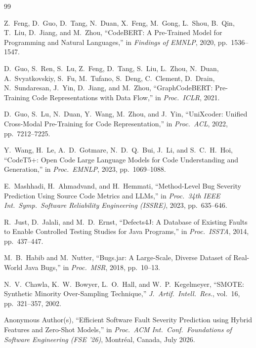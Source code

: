 \documentclass[12pt, a4paper]{report}
\begin{document}
\clearpage
\begin{thebibliography}{99}

Z.\ Feng, D.\ Guo, D.\ Tang, N.\ Duan, X.\ Feng, M.\ Gong, L.\ Shou, B.\ Qin, T.\ Liu, D.\ Jiang, and M.\ Zhou, ``CodeBERT: A Pre-Trained Model for Programming and Natural Languages,'' in \textit{Findings of EMNLP}, 2020, pp.\ 1536--1547.

D.\ Guo, S.\ Ren, S.\ Lu, Z.\ Feng, D.\ Tang, S.\ Liu, L.\ Zhou, N.\ Duan, A.\ Svyatkovskiy, S.\ Fu, M.\ Tufano, S.\ Deng, C.\ Clement, D.\ Drain, N.\ Sundaresan, J.\ Yin, D.\ Jiang, and M.\ Zhou, ``GraphCodeBERT: Pre-Training Code Representations with Data Flow,'' in \textit{Proc.\ ICLR}, 2021.

D.\ Guo, S.\ Lu, N.\ Duan, Y.\ Wang, M.\ Zhou, and J.\ Yin, ``UniXcoder: Unified Cross-Modal Pre-Training for Code Representation,'' in \textit{Proc.\ ACL}, 2022, pp.\ 7212--7225.

Y.\ Wang, H.\ Le, A.\ D.\ Gotmare, N.\ D.\ Q.\ Bui, J.\ Li, and S.\ C.\ H.\ Hoi, ``CodeT5+: Open Code Large Language Models for Code Understanding and Generation,'' in \textit{Proc.\ EMNLP}, 2023, pp.\ 1069--1088.

E.\ Mashhadi, H.\ Ahmadvand, and H.\ Hemmati, ``Method-Level Bug Severity Prediction Using Source Code Metrics and LLMs,'' in \textit{Proc.\ 34th IEEE Int.\ Symp.\ Software Reliability Engineering (ISSRE)}, 2023, pp.\ 635--646.

R.\ Just, D.\ Jalali, and M.\ D.\ Ernst, ``Defects4J: A Database of Existing Faults to Enable Controlled Testing Studies for Java Programs,'' in \textit{Proc.\ ISSTA}, 2014, pp.\ 437--447.

M.\ B.\ Habib and M.\ Nutter, ``Bugs.jar: A Large-Scale, Diverse Dataset of Real-World Java Bugs,'' in \textit{Proc.\ MSR}, 2018, pp.\ 10--13.

N.\ V.\ Chawla, K.\ W.\ Bowyer, L.\ O.\ Hall, and W.\ P.\ Kegelmeyer, ``SMOTE: Synthetic Minority Over-Sampling Technique,'' \textit{J.\ Artif.\ Intell.\ Res.}, vol.\ 16, pp.\ 321--357, 2002.

Anonymous Author(s), ``Efficient Software Fault Severity Prediction using Hybrid Features and Zero-Shot Models,'' in \textit{Proc.\ ACM Int.\ Conf.\ Foundations of Software Engineering (FSE '26)}, Montr\'eal, Canada, July 2026.


\end{thebibliography}
\end{document}
